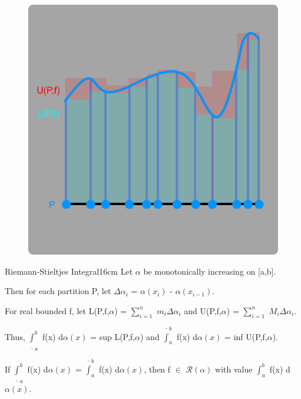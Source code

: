     \begin{figure}[h]
        \centering
        \includegraphics[scale=0.35]{Images/13.1.1.png}
    \end{figure}



    \begin{definition}{Riemann-Stieltjes Integral}{16cm}
        Let $\alpha$ be monotonically increasing on [a,b].
        
        Then for each partition P, let
        $\Delta \alpha_i$ = $\alpha(x_i)$ - $\alpha(x_{i-1})$.

        For real bounded f, let
        L(P,f,$\alpha$) = $\sum_{i=1}^n$ $m_i \Delta \alpha_i$
        and U(P,f,$\alpha$) = $\sum_{i=1}^n$ $M_i \Delta \alpha_i$.

        Thus, $\underline{\int}_a^b$ f(x) d$\alpha(x)$ = sup L(P,f,$\alpha$)
        and $\overline{\int}_a^b$ f(x) d$\alpha(x)$ = inf U(P,f,$\alpha$).

        \vspace{0.2cm}

        If $\underline{\int}_a^b$ f(x) d$\alpha(x)$
        = $\overline{\int}_a^b$ f(x) d$\alpha(x)$, then
        f $\in$ $\mathscr{R}(\alpha)$ with value $\int_a^b$ f(x) d$\alpha(x)$.        
    \end{definition}

